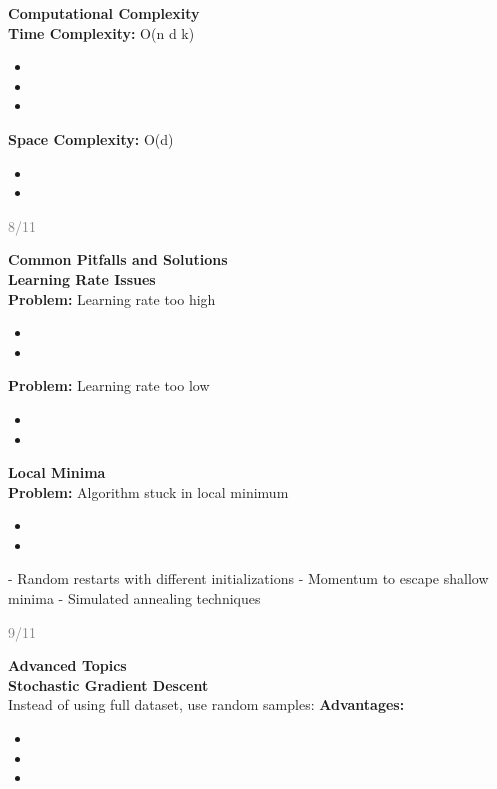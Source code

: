\documentclass[11pt]{article}
\begin{document}
\textbf{\Large Computational Complexity}\\[0.3cm]
\textbf{Time Complexity:} O(n  d  k)
\begin{itemize}
\item \1
\item \1
\item \1
\end{itemize}
\textbf{Space Complexity:} O(d)
\begin{itemize}
\item \1
\item \1
\end{itemize}\n\n\vfill\n\begin{flushright}\n\textcolor{gray}{\small 8/11}\n\end{flushright}\n\n\newpage\n\n\textbf{\huge Common Pitfalls and Solutions}\\[0.5cm]
\textbf{\Large Learning Rate Issues}\\[0.3cm]
\textbf{Problem:} Learning rate too high
\begin{itemize}
\item \1
\item \1
\end{itemize}
\textbf{Problem:} Learning rate too low  
\begin{itemize}
\item \1
\item \1
\end{itemize}
\textbf{\Large Local Minima}\\[0.3cm]
\textbf{Problem:} Algorithm stuck in local minimum
\begin{itemize}
\item \1
\item \1
\end{itemize}
  - Random restarts with different initializations
  - Momentum to escape shallow minima
  - Simulated annealing techniques\n\n\vfill\n\begin{flushright}\n\textcolor{gray}{\small 9/11}\n\end{flushright}\n\n\newpage\n\n\textbf{\huge Advanced Topics}\\[0.5cm]
\textbf{\Large Stochastic Gradient Descent}\\[0.3cm]
Instead of using full dataset, use random samples:
\textbf{Advantages:}
\begin{itemize}
\item \1
\item \1
\item \1
\end{itemize}
\end{document}
